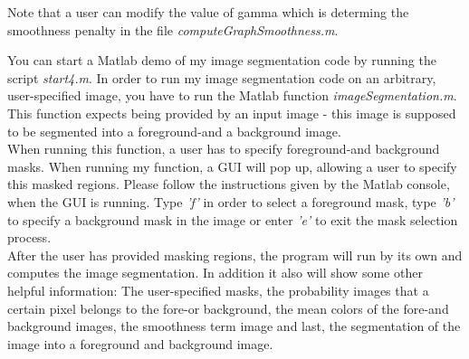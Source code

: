 \documentclass{paper}
\begin{document}
Note that a user can modify the value of gamma which is determing the smoothness penalty in the file \emph{computeGraphSmoothness.m}. \

You can start a Matlab demo of my image segmentation code by running the script \emph{start4.m}. In order to run my image segmentation code on an arbitrary, user-specified image, you have to run the Matlab function \emph{imageSegmentation.m}. This function expects being provided by an input image - this image is supposed to be segmented into a foreground-and a background image. \\

When running this function, a user has to specify foreground-and background masks. When running my function, a GUI will pop up, allowing a user to specify this masked regions. Please follow the instructions given by the Matlab console, when the GUI is running. Type \emph{'f'} in order to select a foreground mask, type \emph{'b'} to specify a background mask in the image or enter \emph{'e'} to exit the mask selection process. \\

After the user has provided masking regions, the program will run by its own and computes the image segmentation. In addition it also will show some other helpful information: The user-specified masks, the probability images that a certain pixel belongs to the fore-or background, the mean colors of the fore-and background images, the smoothness term image and last, the segmentation of the image into a foreground and background image.
\end{document}

